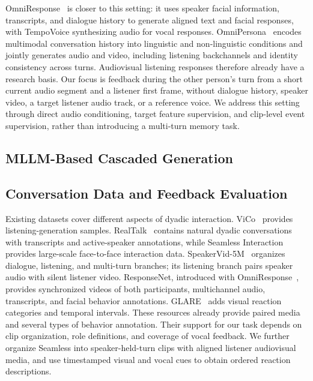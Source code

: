 OmniResponse~\cite{omniresponse} is closer to this setting: it uses speaker facial information, transcripts, and dialogue history to generate aligned text and facial responses, with TempoVoice synthesizing audio for vocal responses. OmniPersona~\cite{omnipersona} encodes multimodal conversation history into linguistic and non-linguistic conditions and jointly generates audio and video, including listening backchannels and identity consistency across turns. Audiovisual listening responses therefore already have a research basis. Our focus is feedback during the other person's turn from a short current audio segment and a listener first frame, without dialogue history, speaker video, a target listener audio track, or a reference voice. We address this setting through direct audio conditioning, target feature supervision, and clip-level event supervision, rather than introducing a multi-turn memory task.

\subsection{MLLM-Based Cascaded Generation}

\subsection{Conversation Data and Feedback Evaluation}
Existing datasets cover different aspects of dyadic interaction. ViCo~\cite{vico} provides listening-generation samples. RealTalk~\cite{realtalk} contains natural dyadic conversations with transcripts and active-speaker annotations, while Seamless Interaction~\cite{seamless} provides large-scale face-to-face interaction data. SpeakerVid-5M~\cite{speakervid} organizes dialogue, listening, and multi-turn branches; its listening branch pairs speaker audio with silent listener video. ResponseNet, introduced with OmniResponse~\cite{omniresponse}, provides synchronized videos of both participants, multichannel audio, transcripts, and facial behavior annotations. GLARE~\cite{glare} adds visual reaction categories and temporal intervals. These resources already provide paired media and several types of behavior annotation. Their support for our task depends on clip organization, role definitions, and coverage of vocal feedback. We further organize Seamless into speaker-held-turn clips with aligned listener audiovisual media, and use timestamped visual and vocal cues to obtain ordered reaction descriptions.

